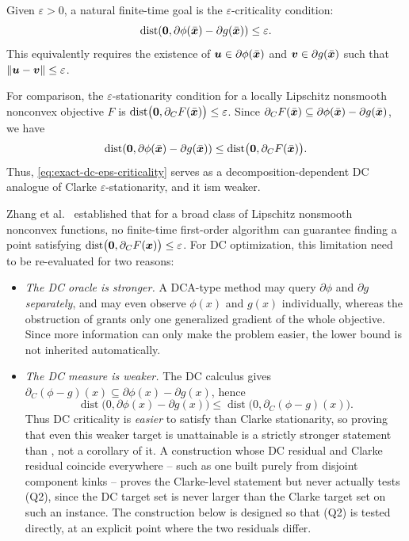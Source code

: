Given $\varepsilon>0$, a natural finite-time goal is the $\varepsilon$-criticality condition:
\begin{equation}
    \label{eq:exact-dc-eps-criticality}
    \operatorname{dist}\!\left( \bm{0}, \partial\phi(\bar{\bm{x}})-\partial g(\bar{\bm{x}}) \right) \le \varepsilon.
\end{equation}
This equivalently requires the existence of $\bm{u}\in\partial\phi(\bar{\bm{x}})$ and $\bm{v}\in\partial g(\bar{\bm{x}})$ such that $\|\bm{u}-\bm{v}\|\le \varepsilon$.

For comparison, the $\varepsilon$-stationarity condition for a locally Lipschitz nonsmooth nonconvex objective $F$ is $\operatorname{dist}\bigl(\bm{0},\partial_C F(\bar{\bm{x}})\bigr) \le \varepsilon$. Since $\partial_C F(\bar{\bm{x}}) \subseteq \partial\phi(\bar{\bm{x}})-\partial g(\bar{\bm{x}})$, we have
\[
    \operatorname{dist}\!\left( \bm{0}, \partial\phi(\bar{\bm{x}})-\partial g(\bar{\bm{x}}) \right) \le \operatorname{dist}\bigl(\bm{0},\partial_C F(\bar{\bm{x}})\bigr).
\]
Thus, \eqref{eq:exact-dc-eps-criticality} serves as a decomposition-dependent DC analogue of Clarke $\varepsilon$-stationarity, and it ism weaker.

Zhang et al.~\citep{Zhang-2020-Complexity} established that for a broad class of Lipschitz nonsmooth nonconvex functions, no finite-time first-order algorithm can guarantee finding a point satisfying $\operatorname{dist}\bigl(\bm{0},\partial_C F(\bm{x})\bigr) \le \varepsilon$. For DC optimization, this limitation need to be re-evaluated for two reasons:
\begin{itemize}
\item[(Q1)] \emph{The DC oracle is stronger.} A DCA-type method may
query $\partial\phi$ and $\partial g$ \emph{separately}, and may even
observe $\phi(x)$ and $g(x)$ individually, whereas the obstruction of
\citet[Theorem~5]{Zhang-2020-Complexity} grants only one generalized
gradient of the whole objective. Since more information can only make
the problem easier, the lower bound is not inherited automatically.
\item[(Q2)] \emph{The DC measure is weaker.} The DC calculus gives
$\partial_C(\phi-g)(x)\subseteq\partial\phi(x)-\partial g(x)$, hence
\[
 \operatorname{dist}\bigl(0,\partial\phi(x)-\partial g(x)\bigr)
 \le
 \operatorname{dist}\bigl(0,\partial_C(\phi-g)(x)\bigr).
\]
Thus DC criticality is \emph{easier} to satisfy than Clarke
stationarity, so proving that even this weaker target is unattainable is
a strictly stronger statement than
\citet[Theorem~5]{Zhang-2020-Complexity}, not a corollary of it. A
construction whose DC residual and Clarke residual coincide everywhere
-- such as one built purely from disjoint component kinks -- proves the
Clarke-level statement but never actually tests (Q2), since the DC
target set is never larger than the Clarke target set on such an
instance. The construction below is designed so that (Q2) is tested
directly, at an explicit point where the two residuals differ.
\end{itemize}


